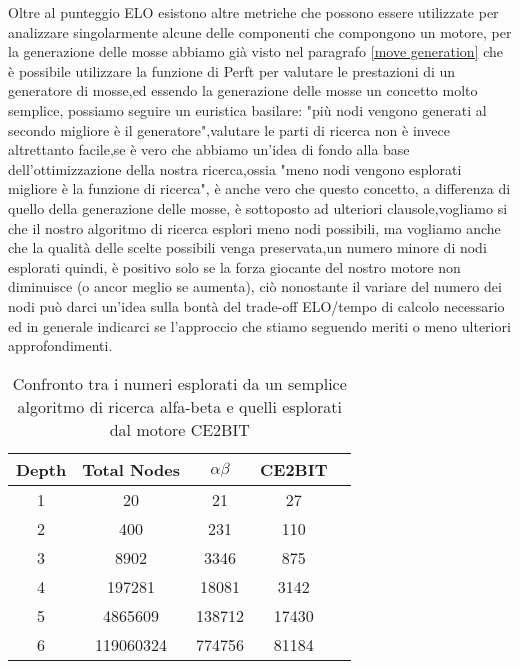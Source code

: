 Oltre al punteggio ELO esistono altre metriche che possono essere utilizzate per analizzare singolarmente alcune delle componenti che compongono un motore,
per la generazione delle mosse abbiamo già visto nel paragrafo \ref{move generation} che è possibile utilizzare la funzione di Perft per valutare le prestazioni di un generatore di mosse,ed essendo la generazione
delle mosse un concetto molto semplice, possiamo seguire un euristica basilare: "più nodi vengono generati al secondo migliore è il generatore",valutare le parti 
di ricerca non è invece altrettanto facile,se è vero che abbiamo un'idea di fondo alla base dell'ottimizzazione della nostra ricerca,ossia "meno nodi vengono esplorati migliore è la funzione di ricerca", è anche vero 
che questo concetto, a differenza di quello della generazione delle mosse, è sottoposto ad ulteriori clausole,vogliamo si che il nostro algoritmo di ricerca esplori meno nodi possibili, ma vogliamo anche che la qualità
delle scelte possibili venga preservata,un numero minore di nodi esplorati quindi, è positivo solo se la forza giocante del nostro motore non diminuisce (o ancor meglio se aumenta), ciò nonostante il variare del numero dei nodi 
può darci un'idea sulla bontà del trade-off ELO/tempo di calcolo necessario ed in generale indicarci se l'approccio che stiamo seguendo meriti o meno ulteriori approfondimenti.
\begin{table}[h]
\begin{center}
    \begin{tabular}{|c|c|c|c|c|} 
     \hline
     Depth & Total Nodes  & $\alpha\beta$ & CE2BIT \\ [0.5ex] 
     \hline
     1 & 20  & 21 & 27 \\ 
     \hline
     2 & 400  &  231 & 110 \\
     \hline
     3 & 8902  &  3346 & 875 \\
     \hline
     4 & 197281  & 18081 &  3142 \\
     \hline
     5 & 4865609  & 138712 & 17430 \\ 
     \hline
     6 & 119060324  & 774756 &   81184 \\
     \hline
    \end{tabular}
    \caption{Confronto tra i numeri esplorati da un semplice algoritmo di ricerca alfa-beta e quelli esplorati dal motore CE2BIT} \label{tab:sometab}
    \end{center}
\end{table}


